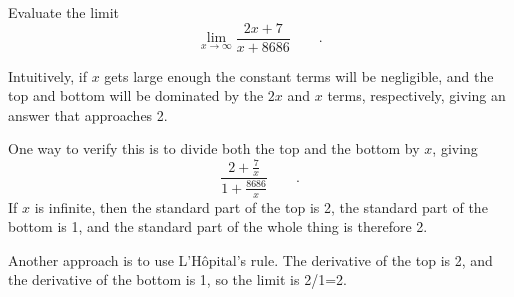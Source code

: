\begin{eg}
\egquestion Evaluate the limit
\begin{equation*}
  \lim_{x\rightarrow \infty} \frac{2x+7}{x+8686} \qquad .
\end{equation*}

\egquestion Intuitively, if $x$ gets large enough the constant terms will be negligible, and
the top and bottom will be dominated by the $2x$ and $x$ terms, respectively, giving an
answer that approaches 2.

One way to verify this is to divide both the top and the bottom by $x$, giving
\begin{equation*}
  \frac{2+\frac{7}{x}}{1+\frac{8686}{x}} \qquad .
\end{equation*}
If $x$ is infinite, then the standard part of the top is 2, the standard part of the
bottom is 1, and the standard part of the whole thing is therefore 2.

Another approach is to use L'H\^{o}pital's rule. The derivative
of the top is 2, and the derivative of the bottom is 1, so the limit is 2/1=2.
\end{eg}

